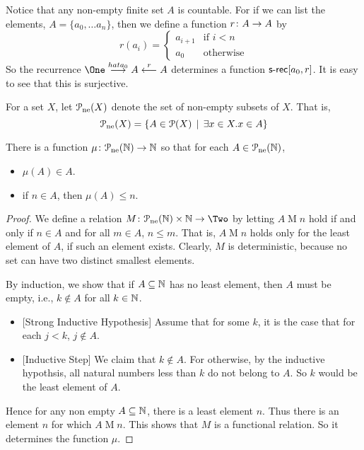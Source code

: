 Notice that any non-empty finite set $A$ is countable. For if we can list the elements,
$A = \{a_0,\ldots a_n\}$, then we define a function ${r}\colon{A}\to{A}$ by
\[r(a_i) = \begin{cases}
a_{i+1} & \text{if $i<n$}\\
a_0     &\text{otherwise}
\end{cases}\]
So the recurrence $\One\stackrel{hat{a_0}}{\longrightarrow}A\stackrel{r}{\longleftarrow}A$ determines a function $\mathord{\textsf{s-rec}}[a_0,r]$. 
It is easy to see that this is surjective.

\begin{defn}
	For a set $X$, let ${\mathcal{P}}_{\text{ne}}(X)$ denote the set of non-empty subsets of $X$. That is, \[{\mathcal{P}}_{\text{ne}}(X) = \{A\in{\mathcal{P}}(X)\,\mid\, \exists x\in X.x\in A\}\]
\end{defn}

\begin{lemma}
	There is a function ${\mu}\colon{{\mathcal{P}}_{\text{ne}}(\mathbb N)}\to{\mathbb N}$ so that for each $A\in {\mathcal{P}}_{\text{ne}}(\mathbb N)$, 
	\begin{itemize}
		\item $\mu(A)\in A$.
		\item if $n\in A$, then $\mu(A)\leq n$.
	\end{itemize}
	
	\begin{proof}
		We define a relation $\fromto M{\powerset_{\text{ne}}(\NN)\times \NN}
		\Two$
		by letting $A\mathrel{M} n$ hold if and only if $n\in A$ and for all $m\in A$, $n\leq m$. That is, $A\mathrel{M} n$ holds only for the least element of $A$, if such an element exists. Clearly, $M$ is deterministic, because no set can have two distinct smallest elements.
		
		By induction, we show that if $A\subseteq \mathbb N$ has no least element, then $A$ must be empty, i.e., $k\notin A$ for all $k\in \mathbb N$.
		\begin{itemize}
			\item{}[Strong Inductive Hypothesis] Assume that for some $k$, it is the case that for each $j<k$, $j\notin A$. 
			\item{}[Inductive Step] We claim that $k\notin A$. For otherwise, by the inductive hypothsis, all natural numbers less than $k$ do not belong to $A$. So $k$ would be the least element of $A$. 
		\end{itemize} 
		Hence for any non empty $A\subseteq \mathbb N$, there is a least element $n$. Thus there is an element $n$ for which $A\mathrel{M}n$. This shows that $M$ is a functional relation. So it determines the function $\mu$.
	\end{proof}
\end{lemma}

